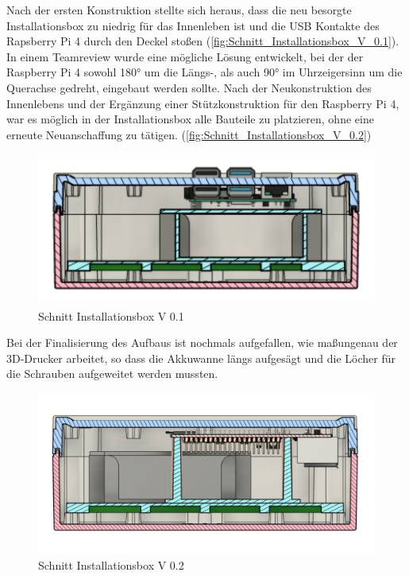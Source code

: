 Nach der ersten Konstruktion stellte sich heraus, dass die neu besorgte Installationsbox zu niedrig für das Innenleben ist und die USB Kontakte des Rapsberry Pi 4 durch den Deckel stoßen (\autoref{fig:Schnitt_Installationsbox_V_0.1}). In einem Teamreview wurde eine mögliche Lösung entwickelt, bei der der Raspberry Pi 4 sowohl \ang{180} um die Längs-, als auch \ang{90} im Uhrzeigersinn um die Querachse gedreht, eingebaut werden sollte. Nach der Neukonstruktion des Innenlebens und der Ergänzung einer Stützkonstruktion für den Raspberry Pi 4, war es möglich in der Installationsbox alle Bauteile zu platzieren, ohne eine erneute Neuanschaffung zu tätigen. (\autoref{fig:Schnitt_Installationsbox_V_0.2})

\begin{figure}[h]
	\begin{center}
		\includegraphics[scale=0.25]{Sections/Konstruktion_des_Aufbaus/Schnitt_Installationsbox_V_0.1}
	\end{center}
	\caption{Schnitt Installationsbox V 0.1}
	\label{fig:Schnitt_Installationsbox_V_0.1}
\end{figure}

Bei der Finalisierung des Aufbaus ist nochmals aufgefallen, wie maßungenau der 3D-Drucker arbeitet, so dass die Akkuwanne längs aufgesägt und die Löcher für die Schrauben aufgeweitet werden mussten.

\begin{figure}[h]
	\begin{center}
		\includegraphics[scale=0.28]{Sections/Konstruktion_des_Aufbaus/Schnitt_Installationsbox_V_0.2}
	\end{center}
	\caption{Schnitt Installationsbox V 0.2}
	\label{fig:Schnitt_Installationsbox_V_0.2}
\end{figure}

